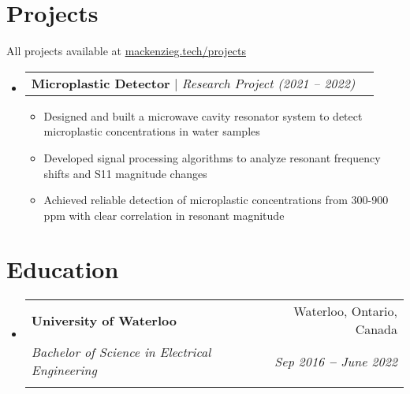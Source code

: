 \documentclass[letterpaper,11pt]{article}
\makeatletter
\newcommand{\resumeItem}[1]{
  \item\small{
    {#1 \vspace{-2pt}}
  }
}
\newcommand{\resumeEducationHeading}[6]{
  \vspace{-2pt}\item
    \begin{tabular*}{0.97\textwidth}[t]{l@{\extracolsep{\fill}}r}
      \textbf{#1} & #2 \\
      \textit{\small#3} & \textit{\small #4} \\
      \textit{\small#5} & \textit{\small #6} \\
    \end{tabular*}\vspace{-5pt}
}
\newcommand{\resumeProjectHeading}[2]{
    \vspace{-2pt}\item
    \begin{tabular*}{0.97\textwidth}{l@{\extracolsep{\fill}}r}
      \small#1 & #2 \\
    \end{tabular*}\vspace{-7pt}
}
\newcommand{\resumeSubHeadingListStart}{\begin{itemize}[leftmargin=0.15in, label={}]}
\newcommand{\resumeSubHeadingListEnd}{\end{itemize}}
\newcommand{\resumeItemListStart}{\begin{itemize}}
\newcommand{\resumeItemListEnd}{\end{itemize}\vspace{-5pt}}
\makeatother
\begin{document}

\section{Projects}
\vspace{3pt}
\small{All projects available at \href{https://mackenzieg.tech/projects}{mackenzieg.tech/projects}}
\vspace{3pt}
\resumeSubHeadingListStart

  \resumeProjectHeading
    {\textbf{Microplastic Detector} $|$ \emph{Research Project (2021 -- 2022)}}{}
      \resumeItemListStart
        \resumeItem{Designed and built a microwave cavity resonator system to detect microplastic concentrations in water samples}
        \resumeItem{Developed signal processing algorithms to analyze resonant frequency shifts and S11 magnitude changes}
        \resumeItem{Achieved reliable detection of microplastic concentrations from 300-900 ppm with clear correlation in resonant magnitude}
      \resumeItemListEnd

\resumeSubHeadingListEnd



\section{Education}
  \vspace{3pt}
  \resumeSubHeadingListStart
    
    \resumeEducationHeading
      {University of Waterloo
      }{Waterloo, Ontario, Canada}
      {Bachelor of Science in Electrical Engineering}{Sep 2016 \textbf{--} June 2022}
      {}{}

  \resumeSubHeadingListEnd




        
\end{document}
